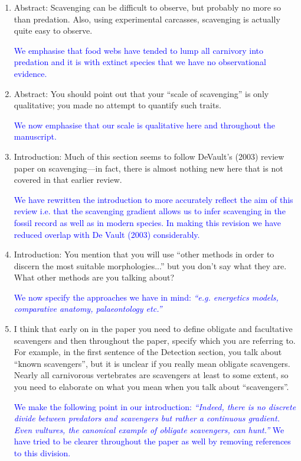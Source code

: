 \documentclass[12pt,letterpaper]{article}
\begin{document}
\begin{enumerate}
\item{Abstract: Scavenging can be difficult to observe, but probably no more so than predation.
Also, using experimental carcasses, scavenging is actually quite easy to observe.}

\textcolor{blue}{We emphasise that food webs have tended to lump all carnivory into predation and it is with extinct species that we have no observational evidence.} 

\item{Abstract: You should point out that your ``scale of scavenging'' is only qualitative; you made no attempt to quantify such traits.}

\textcolor{blue}{We now emphasise that our scale is qualitative here and throughout the manuscript.} 

\item{Introduction: Much of this section seems to follow DeVault's (2003) review paper on scavenging—in fact, there is almost nothing new here that is not covered in that earlier review.}

\textcolor{blue}{We have rewritten the introduction to more accurately reflect the aim of this review i.e. that the scavenging gradient allows us to infer scavenging in the fossil record as well as in modern species. In making this revision we have reduced overlap with De Vault (2003) considerably.} %

\item{Introduction: You mention that you will use ``other methods in order to discern the most suitable morphologies...''  but you don't say what they are. What other methods are you talking about?}

\textcolor{blue}{We now specify the approaches we have in mind:  \textit{``e.g. energetics models, comparative anatomy, palaeontology etc.'' }}

\item{I think that early on in the paper you need to define obligate and facultative scavengers and then throughout the paper, specify which you are referring to. For example, in the first sentence of the Detection section, you talk about ``known scavengers'', but it is unclear if you really mean obligate scavengers. Nearly all carnivorous vertebrates are scavengers at least to some extent, so you need to elaborate on what you mean when you talk about ``scavengers''.}

\textcolor{blue} {We make the following point in our introduction: \textit{``Indeed, there is no discrete divide between predators and scavengers but rather a continuous gradient. Even vultures, the canonical example of obligate scavengers, can hunt.''} We have tried to be clearer throughout the paper as well by removing references to this division.}


\end{enumerate}
\end{document}
